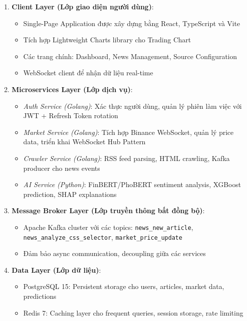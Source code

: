 \begin{enumerate}
    \item \textbf{Client Layer (Lớp giao diện người dùng)}: 
    \begin{itemize}
        \item Single-Page Application được xây dựng bằng React, TypeScript và Vite
        \item Tích hợp Lightweight Charts library cho Trading Chart
        \item Các trang chính: Dashboard, News Management, Source Configuration
        \item WebSocket client để nhận dữ liệu real-time
    \end{itemize}
    
    \item \textbf{Microservices Layer (Lớp dịch vụ)}:
    \begin{itemize}
        \item \textit{Auth Service (Golang)}: Xác thực người dùng, quản lý phiên làm việc với JWT + Refresh Token rotation
        \item \textit{Market Service (Golang)}: Tích hợp Binance WebSocket, quản lý price data, triển khai WebSocket Hub Pattern
        \item \textit{Crawler Service (Golang)}: RSS feed parsing, HTML crawling, Kafka producer cho news events
        \item \textit{AI Service (Python)}: FinBERT/PhoBERT sentiment analysis, XGBoost prediction, SHAP explanations
    \end{itemize}
    
    \item \textbf{Message Broker Layer (Lớp truyền thông bất đồng bộ)}: 
    \begin{itemize}
        \item Apache Kafka cluster với các topics: \texttt{news\_new\_article}, \texttt{news\_analyze\_css\_selector}, \texttt{market\_price\_update}
        \item Đảm bảo async communication, decoupling giữa các services
    \end{itemize}
    
    \item \textbf{Data Layer (Lớp dữ liệu)}:
    \begin{itemize}
        \item PostgreSQL 15: Persistent storage cho users, articles, market data, predictions
        \item Redis 7: Caching layer cho frequent queries, session storage, rate limiting
    \end{itemize}
    

\end{enumerate}
